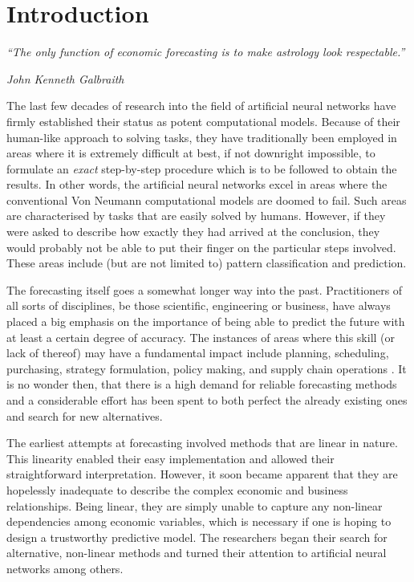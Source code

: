 \chapter{Introduction}

\textit{``The only function of economic forecasting is to make astrology look respectable.''}

\medskip

\hfill \textit{John Kenneth Galbraith}

\bigskip

The last few decades of research into the field of artificial neural networks have firmly established their status as potent computational models. Because of their human-like approach to solving tasks, they have traditionally been employed in areas where it is extremely difficult at best, if not downright impossible, to formulate an \textit{exact} step-by-step procedure which is to be followed to obtain the results. In other words, the artificial neural networks excel in areas where the conventional Von Neumann computational models are doomed to fail. Such areas are characterised by tasks that are easily solved by humans. However, if they were asked to describe how exactly they had arrived at the conclusion, they would probably not be able to put their finger on the particular steps involved. These areas include (but are not limited to) pattern classification and prediction.

\medskip

The forecasting itself goes a somewhat longer way into the past. Practitioners of all sorts of disciplines, be those scientific, engineering or business, have always placed a big emphasis on the importance of being able to predict the future with at least a certain degree of accuracy. The instances of areas where this skill (or lack of thereof) may have a fundamental impact include planning, scheduling, purchasing, strategy formulation, policy making, and supply chain operations \cite{Zhang04}. It is no wonder then, that there is a high demand for reliable forecasting methods and a considerable effort has been spent to both perfect the already existing ones and search for new alternatives.

The earliest attempts at forecasting involved methods that are linear in nature. This linearity enabled their easy implementation and allowed their straightforward interpretation. However, it soon became apparent that they are hopelessly inadequate to describe the complex economic and business relationships. Being linear, they are simply unable to capture any non-linear dependencies among economic variables, which is necessary if one is hoping to design a trustworthy predictive model. The researchers began their search for alternative, non-linear methods and turned their attention to artificial neural networks among others.

